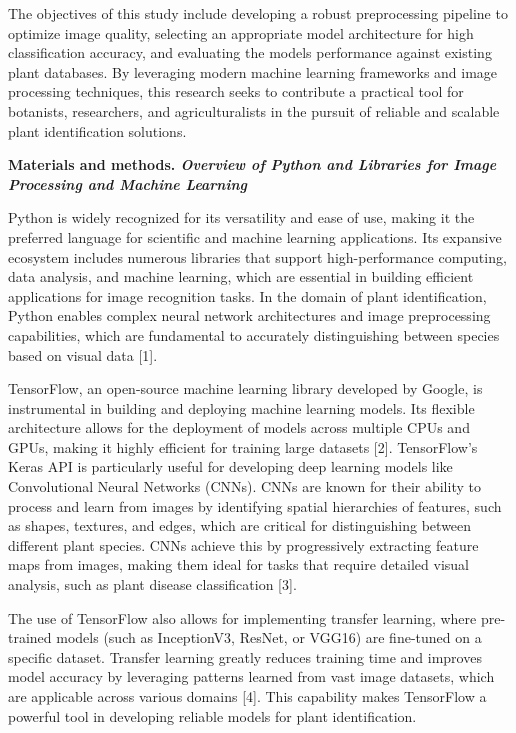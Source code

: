 \documentclass[
]{article}
\begin{document}
The objectives of this study include developing a robust preprocessing
pipeline to optimize image quality, selecting an appropriate model
architecture for high classification accuracy, and evaluating the
model\textquotesingle s performance against existing plant databases. By
leveraging modern machine learning frameworks and image processing
techniques, this research seeks to contribute a practical tool for
botanists, researchers, and agriculturalists in the pursuit of reliable
and scalable plant identification solutions.

\textbf{Materials and methods. \emph{Overview of Python and Libraries
for Image Processing and Machine Learning}}

Python is widely recognized for its versatility and ease of use, making
it the preferred language for scientific and machine learning
applications. Its expansive ecosystem includes numerous libraries that
support high-performance computing, data analysis, and machine learning,
which are essential in building efficient applications for image
recognition tasks. In the domain of plant identification, Python enables
complex neural network architectures and image preprocessing
capabilities, which are fundamental to accurately distinguishing between
species based on visual data {[}1{]}.

TensorFlow, an open-source machine learning library developed by Google,
is instrumental in building and deploying machine learning models. Its
flexible architecture allows for the deployment of models across
multiple CPUs and GPUs, making it highly efficient for training large
datasets {[}2{]}. TensorFlow's Keras API is particularly useful for
developing deep learning models like Convolutional Neural Networks
(CNNs). CNNs are known for their ability to process and learn from
images by identifying spatial hierarchies of features, such as shapes,
textures, and edges, which are critical for distinguishing between
different plant species. CNNs achieve this by progressively extracting
feature maps from images, making them ideal for tasks that require
detailed visual analysis, such as plant disease classification {[}3{]}.

The use of TensorFlow also allows for implementing transfer learning,
where pre-trained models (such as InceptionV3, ResNet, or VGG16) are
fine-tuned on a specific dataset. Transfer learning greatly reduces
training time and improves model accuracy by leveraging patterns learned
from vast image datasets, which are applicable across various domains
{[}4{]}. This capability makes TensorFlow a powerful tool in developing
reliable models for plant identification.
\end{document}
